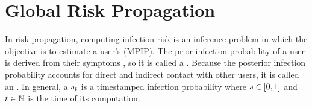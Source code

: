 \clearpage

\section{Global Risk Propagation}

In risk propagation, computing infection risk is an inference problem in which the objective is to estimate a user's  (MPIP). The prior infection probability of a user is derived from their symptoms \cite{Menni2020}, so it is called a . Because the posterior infection probability accounts for direct and indirect contact with other users\footnotemark{}, it is called an . In general, a  $s_t$ is a timestamped infection probability where $s \in [0, 1]$ and $t \in \mathbb{N}$ is the time of its computation.


